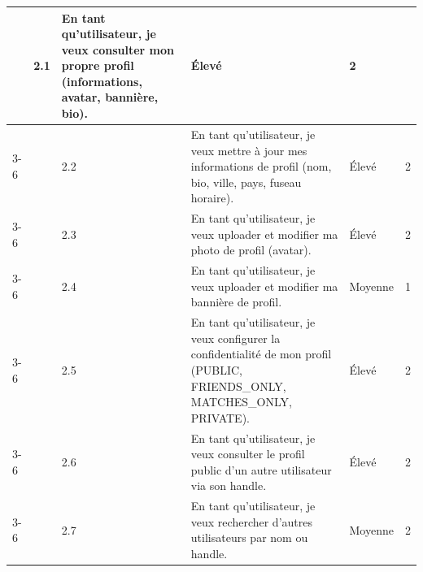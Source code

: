 \documentclass[12pt,a4paper]{report}
\begin{document}
\begin{center}
\begin{longtable}{|p{1cm}|p{3.2cm}|p{1.2cm}|p{7.2cm}|p{1.8cm}|p{1.8cm}|}
  & 2.1 & En tant qu'utilisateur, je veux consulter mon propre profil (informations, avatar, bannière, bio). & Élevé & 2 \\ \cline{3-6}
  & & 2.2 & En tant qu'utilisateur, je veux mettre à jour mes informations de profil (nom, bio, ville, pays, fuseau horaire). & Élevé & 2 \\ \cline{3-6}
  & & 2.3 & En tant qu'utilisateur, je veux uploader et modifier ma photo de profil (avatar). & Élevé & 2 \\ \cline{3-6}
  & & 2.4 & En tant qu'utilisateur, je veux uploader et modifier ma bannière de profil. & Moyenne & 1 \\ \cline{3-6}
  & & 2.5 & En tant qu'utilisateur, je veux configurer la confidentialité de mon profil (PUBLIC, FRIENDS\_ONLY, MATCHES\_ONLY, PRIVATE). & Élevé & 2 \\ \cline{3-6}
  & & 2.6 & En tant qu'utilisateur, je veux consulter le profil public d'un autre utilisateur via son handle. & Élevé & 2 \\ \cline{3-6}
  & & 2.7 & En tant qu'utilisateur, je veux rechercher d'autres utilisateurs par nom ou handle. & Moyenne & 2 \\
\hline
\end{longtable}
\end{center}
\end{document}
